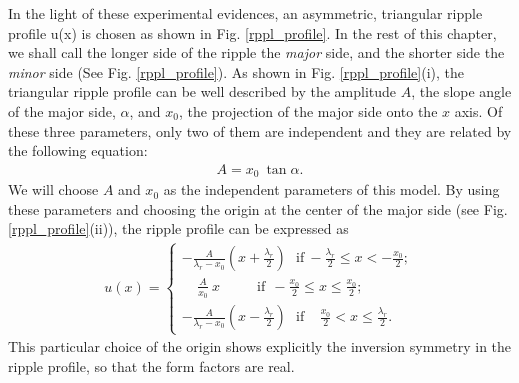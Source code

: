 In the light of these experimental evidences, an asymmetric, 
triangular ripple profile u(x) is chosen as shown in Fig. \ref{rppl_profile}.
In the rest of this chapter, we shall call the longer side of the ripple 
the {\it major} side, and the shorter side the {\it minor} side 
(See Fig. \ref{rppl_profile}).  As shown in Fig. \ref{rppl_profile}(i), the 
triangular ripple profile can be well described by the amplitude $A$, 
the slope angle of the major side, $\alpha$, and $x_0$, the projection of 
the major side onto the $x$ axis. Of these three parameters, only two of 
them are independent and they are related by the following equation:
\begin{eqnarray}
\label{tripara}
A = x_0\ \tan \alpha.
\end{eqnarray}
We will choose $A$ and $x_0$ as the independent parameters of this model.
By using these parameters and choosing the origin at the center of the 
major side (see Fig.\ref{rppl_profile}(ii)), the ripple profile can be 
expressed as
\begin{eqnarray}
\label{profile}
u(x) = \left\{ \begin{array}{ll}
		-\frac{A}{\lambda_r - x_0} (x + \frac{\lambda_r}{2})
\ \ \ \mbox{if}\ - \frac{\lambda_r}{2} \le x < - \frac{x_0}{2};\\
		\ \ \ \ \ \frac{A}{x_0}\ x\ \ \ \ \ \ \ \ \ \ \ \ \mbox{if}
\ \ - \frac{x_0}{2} \le x \le 
\frac{x_0}{2};\\
		-\frac{A}{\lambda_r - x_0} (x - \frac{\lambda_r}{2})
\ \ \ \mbox{if}\ \ \ \ \  \frac{x_0}{2} < x \le \frac{\lambda_r}{2}.
		\end{array}
	\right.
\end{eqnarray}
This particular choice of the origin shows explicitly the inversion
symmetry in the ripple profile, so that the form factors are real.

